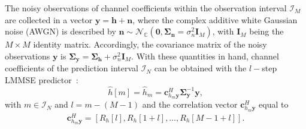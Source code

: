 \documentclass[12pt, draftclsnofoot, onecolumn]{IEEEtran}
\begin{document}
The noisy observations of channel coefficients within the observation interval $\mathcal{I}_M$ are collected in a vector $\mathbf{y} = \mathbf{h} + \mathbf{n}$, where the complex additive white Gaussian noise (AWGN) is described by $\mathbf{n} \sim \mathcal{N}_\mathbb{C}(\mathbf{0},\mathbf{\Sigma}_\mathbf{n} = \sigma_n^2 \mathbf{I}_M)$, with $\mathbf{I}_M$ being the $M\times M$ identity matrix. Accordingly, the covariance matrix of the noisy observations $\mathbf{y}$ is $\mathbf{\Sigma}_\mathbf{y} = \mathbf{\Sigma}_{\mathbf{h}}  + \sigma_n^2 \mathbf{I}_M$. With these quantities in hand, channel coefficients of the prediction interval $\mathcal{I}_N$ can be obtained with the $l-$step LMMSE predictor~\cite{Zemen,Kay}:
\begin{equation}
\hat{h}[m] = \hat{h}_m = \mathbf{c}_{h_{m}\mathbf{y}}^{H} \mathbf{\Sigma}_{\mathbf{y}}^{-1} \mathbf{y},
\label{lstepWP}
\end{equation}
with $m \in \mathcal{I}_N$ and $l = m-(M-1)$ and the correlation vector $ \mathbf{c}_{h_{m}\mathbf{y}}^{H}$ equal to
\begin{align}
 \mathbf{c}_{h_{m}\mathbf{y}}^{H} = [R_h[l], R_h[1+l], \dots, R_h[M-1+l]].
\end{align}
\end{document}
